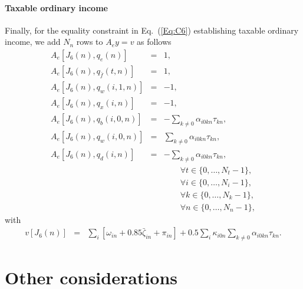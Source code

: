 \documentclass{report}[fleqn,11pt]
\begin{document}
\paragraph*{Taxable ordinary income}
Finally, for the equality constraint in Eq.~(\ref{Eq:C6}) establishing taxable
ordinary income, we add $N_n$ rows to $A_ey = v$ as follows
\begin{eqnarray}
	A_e[J_6(n), q_e(n)] &=& 1, \nonumber \\
	A_e[J_6(n), q_{\bar{f}}(t, n)] &=& 1, \nonumber \\
	A_e[J_6(n), q_w(i, 1, n)] &=& -1, \nonumber \\
	A_e[J_6(n), q_x(i, n)] &=& -1, \nonumber \\
	A_e[J_6(n), q_b(i, 0, n)] &=& -\sum_{k\neq 0} \alpha_{i0kn}\tau_{kn}, \\
	A_e[J_6(n), q_w(i, 0, n)] &=&  \sum_{k\neq 0} \alpha_{i0kn}\tau_{kn}, \nonumber \\
	A_e[J_6(n), q_d(i, n)] &=&    -\sum_{k\neq 0} \alpha_{i0kn}\tau_{kn}, \nonumber \\
	&&\qquad\forall t \in \{0,\ldots, N_t-1\},\nonumber\\
	&&\qquad\forall i \in \{0,\ldots, N_i-1\},\nonumber\\
	&&\qquad\forall k \in \{0,\ldots, N_k-1\},\nonumber\\
	&&\qquad\forall n \in \{0,\ldots, N_n-1\}, \nonumber
\end{eqnarray}
with
\begin{eqnarray}
	v[J_6(n)] &=& 
	\sum_i [\omega_{in} + 0.85\bar\zeta_{in}  + \pi_{in}]
	+ 0.5\sum_{i} \kappa_{i0n} \sum_{k\neq 0} \alpha_{i0kn}\tau_{kn}.
\end{eqnarray}

\section{Other considerations}
\end{document}
